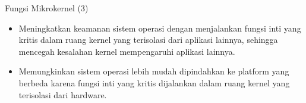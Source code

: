 \documentclass[aspectratio=169, table]{beamer}
\begin{document}
    \begin{frame}{Fungsi Mikrokernel (3)}
        \begin{itemize}
            \item Meningkatkan keamanan sistem operasi dengan menjalankan fungsi inti yang kritis dalam ruang kernel yang terisolasi dari aplikasi lainnya, sehingga mencegah kesalahan kernel mempengaruhi aplikasi lainnya.

            \item Memungkinkan sistem operasi lebih mudah dipindahkan ke platform yang berbeda karena fungsi inti yang kritis dijalankan dalam ruang kernel yang terisolasi dari hardware.
        \end{itemize}
    \end{frame}
\end{document}
